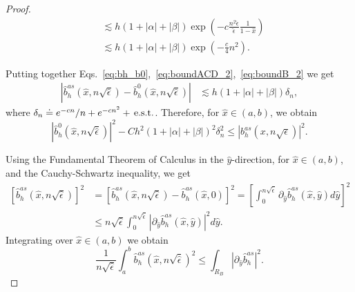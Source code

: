 \documentclass{article}
\newcommand{\est}{\text{\,e.s.t.}\xspace}
\newcommand{\nsep}{\ensuremath{n\sqrt{\epsilon}}}
\newcommand{\hatb}{\ensuremath{\hat{b}}}
\newcommand{\hatx}{\ensuremath{{\hat{x}}}}
\newcommand{\haty}{\ensuremath{{\hat{y}}}}
\newcommand{\hatnsep}{\ensuremath{n\sqrt{\hat{\epsilon}}}}
\begin{document}
\begin{appendix}
\begin{proof}
\begin{equation}
\begin{aligned}
    &  \lesssim h(1+|\alpha|+|\beta|)
    \exp(-c\frac{n^2\hat{\epsilon}}{\hat{\epsilon}}\frac{1}{1-\hatx})
    \\
    & 
    \lesssim h(1+|\alpha|+|\beta|)
    \exp(-\frac{c}{4}n^2).
\end{aligned}
\end{equation}

Putting together Eqs.~\eqref{eq:bh_b0},~\eqref{eq:boundACD_2},~\eqref{eq:boundB_2} we get
\begin{equation*}
\label{eq:bh0-right-2}
\begin{aligned}
        |\hatb_h^{as}(\hatx,\hatnsep)-\hatb_h^0(\hatx,\hatnsep)|
         &\lesssim 
         h(1+|\alpha|+|\beta|)\delta_n,
\end{aligned}
\end{equation*}
where $\delta_n \doteq e^{-cn}/n+e^{-cn^2}+\est$.
Therefore, for $\hatx\in(a,b)$, we obtain
\begin{equation}\label{eq:bound_bh2}
    |\hatb_h^0(\hatx,\hatnsep)|^2 - 
    C h^2(1+|\alpha|+|\beta|)^2\delta_n^2
    \leq 
    |b_h^{as}(x,\nsep)|^2.
\end{equation}

Using the Fundamental Theorem of Calculus in the $\haty$-direction, for $\hatx\in(a,b)$, and the Cauchy-Schwartz inequality, we get
\begin{align*}
    \left[\hatb_h^{as}(\hatx,\hatnsep)\right]^2 
    &= \left[\hatb_h^{as}(\hatx,\hatnsep)-\hatb_h^{as}(\hatx,0)\right]^2 
    = \left[\int_0^{\hatnsep}\partial_\haty \hatb_h^{as}(\hatx,\haty) d\haty\right]^2
    \\
    &\le 
     \hatnsep \int_0^{\hatnsep}|\partial_\haty \hatb_h^{as}(\hatx,\haty)|^2 d\haty.
 \end{align*}
Integrating over $\hatx\in(a,b)$ we obtain
\begin{equation*}
\frac{1}{\hatnsep}\int_a^b \hatb_h^{as}(\hatx,\hatnsep)^2\leq\int_{R_B}|\partial_\haty \hatb_h^{as}|^2.
\end{equation*}


\end{proof}
\end{appendix}
\end{document}

